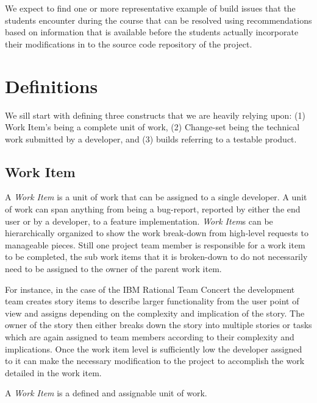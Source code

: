We expect to find one or more representative example of build issues that the students encounter during the course that can be resolved using recommendations based on information that is available before the students actually incorporate their modifications in to the source code repository of the project.

\section{Definitions}
\label{c5:sec:definitions}
We sill start with defining three constructs that we are heavily relying upon: (1) Work Item's being a complete unit of work, (2) Change-set being the technical work submitted by a developer, and (3) builds referring to a testable product.

\subsection{Work Item}
A \emph{Work Item} is a unit of work that can be assigned to a single developer.
A unit of work can span anything from being a bug-report, reported by either the end user or by a developer, to a feature implementation.
\emph{Work Item}s can be hierarchically organized to show the work break-down from high-level requests to manageable pieces.
Still one project team member is responsible for a work item to be completed, the sub work items that it is broken-down to do not necessarily need to be assigned to the owner of the parent work item.

For instance, in the case of the IBM Rational Team Concert the development team creates story items to describe larger functionality from the user point of view and assigns depending on the complexity and implication of the story.
The owner of the story then either breaks down the story into multiple stories or tasks which are again assigned to team members according to their complexity and implications.
Once the work item level is sufficiently low the developer assigned to it can make the necessary modification to the project to accomplish the work detailed in the work item.

\begin{note}
\begin{mydef}
A \emph{Work Item} is a defined and assignable unit of work.
\end{mydef}
\end{note} 


